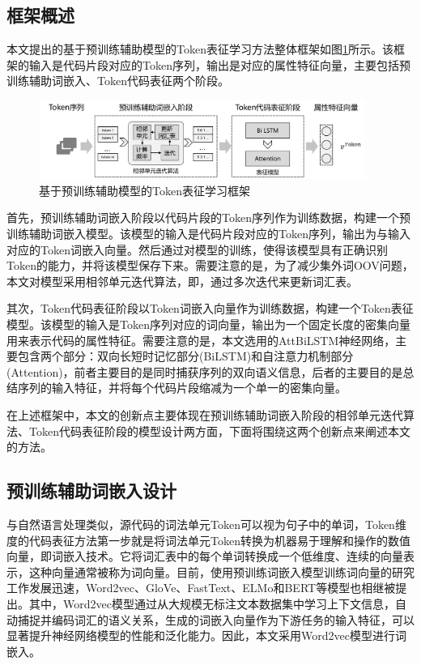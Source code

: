 \subsection{框架概述}
\label{subsec:TokenOverview}
本文提出的基于预训练辅助模型的Token表征学习方法整体框架如图\ref{fig:tokenframework}所示。该框架的输入是代码片段对应的Token序列，输出是对应的属性特征向量，主要包括预训练辅助词嵌入、Token代码表征两个阶段。

\begin{figure}[H]
  \centering
  \includegraphics[width=0.95\textwidth]{figures/tokenframework}
  \caption{基于预训练辅助模型的Token表征学习框架}\label{fig:tokenframework}
\end{figure}

首先，预训练辅助词嵌入阶段以代码片段的Token序列作为训练数据，构建一个预训练辅助词嵌入模型。该模型的输入是代码片段对应的Token序列，输出为与输入对应的Token词嵌入向量。然后通过对模型的训练，使得该模型具有正确识别Token的能力，并将该模型保存下来。需要注意的是，为了减少集外词OOV问题，本文对模型采用相邻单元迭代算法，即，通过多次迭代来更新词汇表。

其次，Token代码表征阶段以Token词嵌入向量作为训练数据，构建一个Token表征模型。该模型的输入是Token序列对应的词向量，输出为一个固定长度的密集向量用来表示代码的属性特征。需要注意的是，本文选用的AttBiLSTM神经网络，主要包含两个部分：双向长短时记忆部分(BiLSTM)和自注意力机制部分(Attention)，前者主要目的是同时捕获序列的双向语义信息，后者的主要目的是总结序列的输入特征，并将每个代码片段缩减为一个单一的密集向量。

在上述框架中，本文的创新点主要体现在预训练辅助词嵌入阶段的相邻单元迭代算法、Token代码表征阶段的模型设计两方面，下面将围绕这两个创新点来阐述本文的方法。

\subsection{预训练辅助词嵌入设计}
\label{subsec:Model}

与自然语言处理类似，源代码的词法单元Token可以视为句子中的单词，Token维度的代码表征方法第一步就是将词法单元Token转换为机器易于理解和操作的数值向量，即词嵌入技术。它将词汇表中的每个单词转换成一个低维度、连续的向量表示，这种向量通常被称为词向量。目前，使用预训练词嵌入模型训练词向量的研究工作发展迅速，Word2vec、GloVe、FastText、ELMo和BERT等模型也相继被提出。其中，Word2vec模型通过从大规模无标注文本数据集中学习上下文信息，自动捕捉并编码词汇的语义关系，生成的词嵌入向量作为下游任务的输入特征，可以显著提升神经网络模型的性能和泛化能力。因此，本文采用Word2vec模型进行词嵌入。

